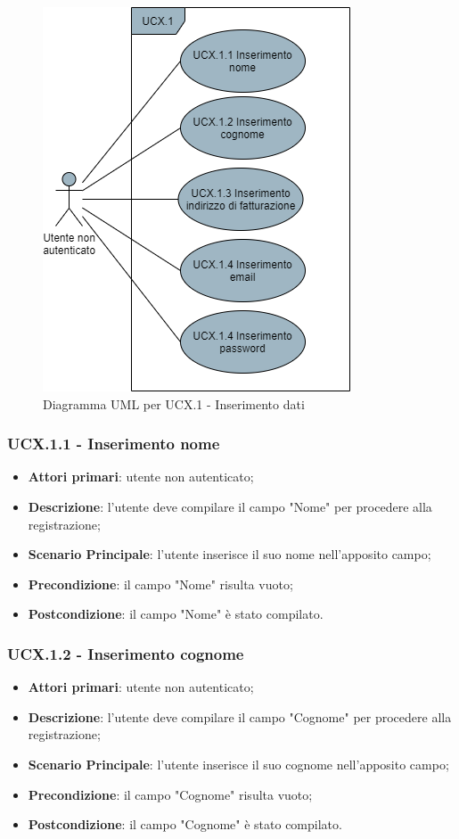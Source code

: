 \begin{figure}[H]
\centering
\includegraphics[scale=0.6]{res/UseCase/Immagini/InserimentoDatiRegistrazione}
\caption{Diagramma UML per UCX.1 - Inserimento dati}
\end{figure}


\subsubsection{UCX.1.1 - Inserimento nome}
\begin{itemize}
\item \textbf{Attori primari}: utente non autenticato;
\item \textbf{Descrizione}: l'utente deve compilare il campo "Nome" per procedere alla registrazione;
\item \textbf{Scenario Principale}: l'utente inserisce il suo nome nell'apposito campo;
\item \textbf{Precondizione}: il campo "Nome" risulta vuoto;
\item \textbf{Postcondizione}: il campo "Nome" è stato compilato.
\end{itemize}

\subsubsection{UCX.1.2 - Inserimento cognome}
\begin{itemize}
\item \textbf{Attori primari}: utente non autenticato;
\item \textbf{Descrizione}: l'utente deve compilare il campo "Cognome" per procedere alla registrazione;
\item \textbf{Scenario Principale}: l'utente inserisce il suo cognome nell'apposito campo;
\item \textbf{Precondizione}: il campo "Cognome" risulta vuoto;
\item \textbf{Postcondizione}: il campo "Cognome" è stato compilato.
\end{itemize}

